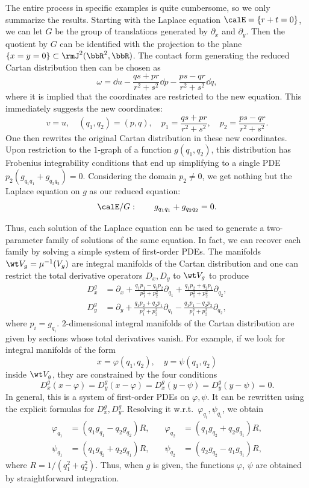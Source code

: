 \begin{example}
    The entire process in specific examples is quite cumbersome, so we only summarize the results. Starting with the Laplace equation $\calE=\{r+t=0\}$, we can let $G$ be the group of translations generated by $\partial_x$ and $\partial_y$. Then the quotient by $G$ can be identified with the projection to the plane $\{x=y=0\}\subset\rmJ^2(\bbR^2,\bbR)$. The contact form generating the reduced Cartan distribution then can be chosen as 
    \[\omega=\dd u-\frac{qs+pr}{r^2+s^2}\dd p-\frac{ps-qr}{r^2+s^2}\dd q,\]
    where it is implied that the coordinates are restricted to the new equation. This immediately suggests the new coordinates:
    \[v=u,\quad (q_1,q_2)=(p,q),\quad p_1=\frac{qs+pr}{r^2+s^2},\quad p_2=\frac{ps-qr}{r^2+s^2}.\]
    One then rewrites the original Cartan distribution in these new coordinates. Upon restriction to the $1$-graph of a function $g(q_1,q_2)$, this distribution has Frobenius integrability conditions that end up simplifying to a single PDE $p_2(g_{q_1q_1}+g_{q_2q_2})=0$. Considering the domain $p_2\neq 0$, we get nothing but the Laplace equation on $g$ as our reduced equation:
    \[\calE\slash G:\quad \quad g_{q_1q_1}+g_{q_2q_2}=0.\]

    Thus, each solution of the Laplace equation can be used to generate a two-parameter family of solutions of the same equation. In fact, we can recover each family by solving a simple system of first-order PDEs. The manifolds $\wt V_g=\mu^{-1}(V_g)$ are integral manifolds of the Cartan distribution and one can restrict the total derivative operators $D_x,D_y$ to $\wt V_g$ to produce 
    \begin{align}
        D^g_{x}&=\partial_x+\frac{q_1p_1-q_2p_2}{p_1^2+p_2^2}\partial_{q_1}+\frac{q_1p_2+q_2p_1}{p_1^2+p_2^2}\partial_{q_2},\\
        D^g_y&=\partial_y+\frac{q_1p_2+q_2p_1}{p_1^2+p_2^2}\partial_{q_1}-\frac{q_1p_1-q_2p_2}{p_1^2+p_2^2}\partial_{q_2},
    \end{align}
    where $p_i=g_{q_i}$. $2$-dimensional integral manifolds of the Cartan distribution are given by sections whose total derivatives vanish. For example, if we look for integral manifolds of the form 
    \[x=\varphi(q_1,q_2),\quad y=\psi(q_1,q_2)\]
    inside $\wt V_g$, they are constrained by the four conditions 
    \[D^g_x(x-\varphi)=D^g_y(x-\varphi)=D^g_x(y-\psi)=D^g_y(y-\psi)=0.\]
    In general, this is a system of first-order PDEs on $\varphi,\psi$. It can be rewritten using the explicit formulas for $D^g_x,D^g_y$. Resolving it w.r.t.\ $\varphi_{q_i},\psi_{q_i}$, we obtain 
    \begin{align}
        \varphi_{q_1}&=\left(q_1g_{q_1}-q_2g_{q_2}\right)R, \quad & \varphi_{q_2}&=\left(q_1g_{q_2}+q_2g_{q_1}\right)R,\\ 
        \psi_{q_1}&=\left(q_1g_{q_2}+q_2g_{q_1}\right)R,\quad &\psi_{q_2}&=\left(q_2g_{q_2}-q_1g_{q_1}\right)R,
    \end{align}
    where $R=1/(q_1^2+q_2^2)$. Thus, when $g$ is given, the functions $\varphi$, $\psi$ are obtained by straightforward integration.


\end{example}
